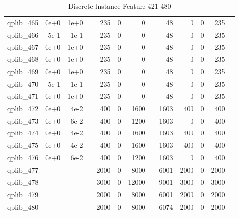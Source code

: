 \begin{table}
\begin{tabular}{lrrrrrrrrrrrr}
qplib\_465	&	0e+0	&	1e+0	&	&	235	&	0	&	0	&	&	48	&	0	&	0	&	235	\\
qplib\_466	&	5e-1	&	1e-1	&	&	235	&	0	&	0	&	&	48	&	0	&	0	&	235	\\
qplib\_467	&	0e+0	&	1e+0	&	&	235	&	0	&	0	&	&	48	&	0	&	0	&	235	\\
qplib\_468	&	0e+0	&	1e+0	&	&	235	&	0	&	0	&	&	48	&	0	&	0	&	235	\\
qplib\_469	&	0e+0	&	1e+0	&	&	235	&	0	&	0	&	&	48	&	0	&	0	&	235	\\
qplib\_470	&	5e-1	&	1e-1	&	&	235	&	0	&	0	&	&	48	&	0	&	0	&	235	\\
qplib\_471	&	0e+0	&	1e+0	&	&	235	&	0	&	0	&	&	48	&	0	&	0	&	235	\\
qplib\_472	&	0e+0	&	4e-2	&	&	400	&	0	&	1600	&	&	1603	&	400	&	0	&	400	\\
qplib\_473	&	0e+0	&	6e-2	&	&	400	&	0	&	1200	&	&	1603	&	0	&	0	&	400	\\
qplib\_474	&	0e+0	&	4e-2	&	&	400	&	0	&	1600	&	&	1603	&	400	&	0	&	400	\\
qplib\_475	&	0e+0	&	4e-2	&	&	400	&	0	&	1600	&	&	1603	&	400	&	0	&	400	\\
qplib\_476	&	0e+0	&	6e-2	&	&	400	&	0	&	1200	&	&	1603	&	0	&	0	&	400	\\
qplib\_477	&		&		&	&	2000	&	0	&	8000	&	&	6001	&	2000	&	0	&	2000	\\
qplib\_478	&		&		&	&	3000	&	0	&	12000	&	&	9001	&	3000	&	0	&	3000	\\
qplib\_479	&		&		&	&	2000	&	0	&	8000	&	&	6001	&	2000	&	0	&	2000	\\
qplib\_480	&		&		&	&	2000	&	0	&	8000	&	&	6074	&	2000	&	0	&	2000	\\



\bottomrule

\end{tabular}  
\label{tab:A8}
\caption{Discrete  Instance Feature 421-480} 

\end{table}

